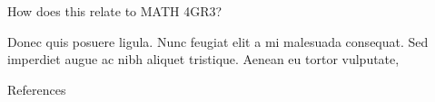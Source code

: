 \documentclass[final]{beamer}
\newlength{\sepwidth}
\newlength{\colwidth}
\newcommand{\separatorcolumn}{\begin{column}{\sepwidth}\end{column}}
\begin{document}
\begin{frame}[t]
\begin{columns}[t]
\begin{column}{\colwidth}
\begin{alertblock}{How does this relate to MATH 4GR3?}

    Donec quis posuere ligula. Nunc feugiat elit a mi malesuada consequat. Sed
    imperdiet augue ac nibh aliquet tristique. Aenean eu tortor vulputate,

  \end{alertblock}

  \begin{block}{References}

    \nocite{*}
    \footnotesize{}

  \end{block}

\end{column}

\separatorcolumn
\end{columns}
\end{frame}
\end{document}
